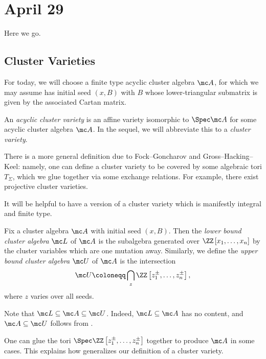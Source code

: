 \documentclass[../notes.tex]{subfiles}
\begin{document}
\section{April 29}
Here we go.

\subsection{Cluster Varieties}
For today, we will choose a finite type acyclic cluster algebra $\mc A$, for which we may assume has initial seed $(x,B)$ with $B$ whose lower-triangular submatrix is given by the associated Cartan matrix.
\begin{definition}
	An \textit{acyclic cluster variety} is an affine variety isomorphic to $\Spec\mc A$ for some acyclic cluster algebra $\mc A$. In the sequel, we will abbreviate this to a \textit{cluster variety}.
\end{definition}
\begin{remark} \label{rem:general-cluster-variety}
	There is a more general definition due to Fock--Goncharov and Gross--Hacking--Keel: namely, one can define a cluster variety to be covered by some algebraic tori $T_\Sigma$, which we glue together via some exchange relations. For example, there exist projective cluster varieties.
\end{remark}
It will be helpful to have a version of a cluster variety which is manifestly integral and finite type.
\begin{definition}
	Fix a cluster algebra $\mc A$ with initial seed $(x,B)$. Then the \textit{lower bound cluster algebra} $\mc L$ of $\mc A$ is the subalgebra generated over $\ZZ\left[x_1,\ldots,x_n\right]$ by the cluster variables which are one mutation away. Similarly, we define the \textit{upper bound cluster algebra} $\mc U$ of $\mc A$ is the intersection
	\[\mc U\coloneqq\bigcap_{z}\ZZ\left[z_1^\pm,\ldots,z_n^\pm\right],\]
	where $z$ varies over all seeds.
\end{definition}
\begin{remark}
	Note that $\mc L\subseteq\mc A\subseteq\mc U$. Indeed, $\mc L\subseteq\mc A$ has no content, and $\mc A\subseteq\mc U$ follows from .
\end{remark}
\begin{remark}
	One can glue the tori $\Spec\ZZ\left[z_1^\pm,\ldots,z_n^\pm\right]$ together to produce $\mc A$ in some cases. This explains how  generalizes our definition of a cluster variety.
\end{remark}
\end{document}
